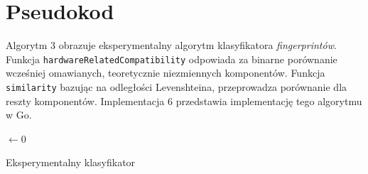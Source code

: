 

\section{Pseudokod}
Algorytm 3 obrazuje eksperymentalny algorytm klasyfikatora \emph{fingerprintów}.
Funkcja \texttt{hardwareRelatedCompatibility} odpowiada za binarne porównanie
wcześniej omawianych, teoretycznie niezmiennych komponentów. Funkcja
\texttt{similarity} bazując na odległości Levenshteina, przeprowadza porównanie
dla reszty komponentów. Implementacja 6 przedstawia implementację tego algorytmu
w Go.


\begin{algorithm}
	\SetAlgoVlined
	\BlankLine
	\BlankLine
	\VarMax $\leftarrow 0$\;
	\ForEach{\VarG $\in$ \SetG}{
		\If{\HardwareRelatedCompatibility{\VarF, \VarG} $< \alpha$}{
			\Continue\;
		}
		\BlankLine
		\VarRatio $\leftarrow$ \Similarity{\VarF, \VarG}\;
		\BlankLine
		\If{\VarRatio $>$ \VarMax}{
			\VarMax $\leftarrow$ \VarRatio\;
			\VarCandidate $\leftarrow$ \VarG\;
		}
	}
	\If{\VarMax $\ge \beta$}{
		\Return{\VarCandidate}\;
	}
	\Return{\Null}\;
	\caption{Eksperymentalny klasyfikator}
\end{algorithm}

